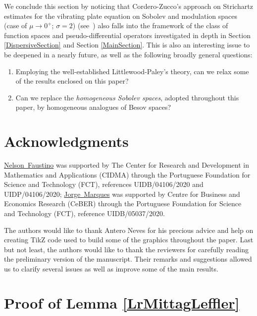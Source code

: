\documentclass{amsart}
\theoremstyle{definition}
\theoremstyle{remark}
\numberwithin{equation}{section}
\begin{document}
{			We conclude this section by noticing that Cordero-Zucco's approach on Strichartz estimates for the vibrating plate equation on Sobolev and modulation spaces (case of $\mu\rightarrow 0^+$; $\sigma=2$) (see~\cite{CZ11,CZ11modulation}) also falls into the framework of the class of function spaces and pseudo-differential operators investigated in depth in Section \ref{DispersiveSection} and Section \ref{MainSection}. This is also an interesting issue to be deepened in a nearly future, as well as the following broadly general questions:
			\begin{enumerate}
				\item[\bf Q4:] Employing the well-established {Littlewood-Paley's theory}, can we relax some of the results enclosed on this paper?
				\item[\bf Q5:] Can we replace the {\it homogeneous Sobolev spaces}, adopted throughout this paper, by homogeneous analogues of Besov spaces?
			\end{enumerate}
			
			\section{Acknowledgments}
			\href{http://orcid.org/0000-0002-9117-2021}{Nelson~Faustino} was supported by The Center for Research and Development in Mathematics and Applications (CIDMA) through the Portuguese Foundation for Science and Technology (FCT), references UIDB/04106/2020 and UIDP/04106/2020; \href{https://orcid.org/0000-0003-3825-6389}{Jorge~Marques} was supported by Centre for Business and Economics Research (CeBER) through the Portuguese Foundation for Science and Technology (FCT), reference UIDB/05037/2020.
			
			The authors would like to thank Antero Neves for his precious advice and help on creating TikZ code used to build some of the graphics throughout the paper. 
			Last but not least, the authors would like to thank the reviewers for carefully reading the preliminary version of the manuscript. Their remarks and suggestions allowed us to clarify several issues as well as improve some of the main results.
			
			
			
			
			
			\newpage 
			\appendix
			
			
			\section{Proof of Lemma \ref{LrMittagLeffler}}\label{AppendixA}
			
}
\end{document}
